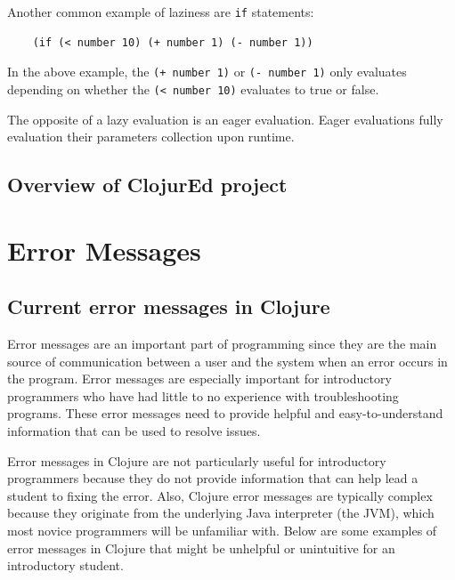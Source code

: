 \documentclass[12pt]{article}
\newcommand{\comment}[1]{{\bf \tt  {#1}}}
\newcommand{\emcomment}[1]{\textcolor{ForestGreen}{\comment{Elena: {#1}}}}
\begin{document}
Another common example of laziness are \texttt{if} statements:

\begin{verbatim}
	(if (< number 10) (+ number 1) (- number 1))
\end{verbatim}

In the above example, the \texttt{(+ number 1)} or \texttt{(- number 1)} only evaluates depending on
whether the \texttt{(< number 10)} evaluates to true or false.

The opposite of a lazy evaluation is an eager evaluation. Eager evaluations fully evaluation their
parameters collection upon runtime.


\subsection{Overview of ClojurEd project}\label{sec:project}



\section{Error Messages}\label{sec:errors}

\subsection{Current error messages in Clojure}\label{sec:currentem}
Error messages are an important part of programming since they are the main source of communication between a user and the system when an error occurs in the program.
Error messages are especially important for introductory programmers who have had little to no experience with troubleshooting programs. %
These error messages need to provide helpful and easy-to-understand information that can be used to resolve issues.

Error messages in Clojure are not particularly useful for introductory programmers because they do not provide information that can help lead a student to fixing the error.
Also, Clojure error messages are typically complex because they originate from the underlying Java interpreter (the JVM), which most %
novice programmers will be unfamiliar with.
Below are some examples of error messages in Clojure that might be unhelpful or unintuitive for an introductory student.
\end{document}
